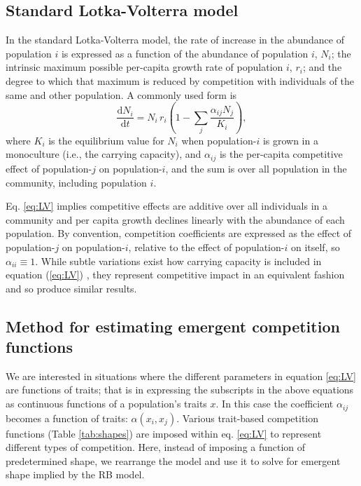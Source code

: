 \documentclass[a4paper,11pt]{article}
\newcommand{\ud}{\ensuremath{\mathrm{d}}}
\begin{document}
\subsection{Standard Lotka-Volterra model}

In the standard Lotka-Volterra model, the rate of increase in the abundance of population $i$ is expressed as a function of the abundance of population $i$, $N_i$; the intrinsic maximum possible per-capita growth rate of population $i$, $r_i$; and the degree to which that maximum is reduced by competition with individuals of the same and other population. A commonly used form \citep[e.g.][]{Lotka-1932, Andrewartha-1953, Dieckmann-1999} is 
\begin{equation} \label{eq:LV} 
	\frac{\ud N_i}{\ud t} = N_i\, r_i \left(1 - \sum_j \frac{\alpha_{ij} N_j}{K_i}\right), 
\end{equation}
where $K_i$ is the equilibrium value for $N_i$ when population-$i$ is grown in a monoculture (i.e., the carrying capacity), and $\alpha_{ij}$ is the per-capita competitive effect of population-$j$ on population-$i$, and the sum is over all population in the community, including population $i$. 

Eq. \ref{eq:LV} implies competitive effects are additive over all individuals in a community and per capita growth declines linearly with the abundance of each population. By convention, competition coefficients are expressed as the effect of population-$j$ on population-$i$, relative to the effect of population-$i$ on itself, so $\alpha_{ii} \equiv 1$. While subtle variations exist how carrying capacity is included in equation (\ref{eq:LV}) \citep[e.g.][]{Chesson-2000, Leimar-2013}, they represent competitive impact in an equivalent fashion and so produce similar results.

\subsection{Method for estimating emergent competition functions}

We are interested in situations where the different parameters in equation \ref{eq:LV} are functions of traits; that is in expressing the subscripts in the above equations as continuous functions of a population’s traits $x$. In this case the coefficient $\alpha_{ij}$ becomes a function of traits: $\alpha(x_i, x_j)$. Various trait-based competition functions (Table \ref{tab:shapes}) are imposed within eq. \ref{eq:LV} to represent different types of competition. Here, instead of imposing a function of predetermined shape, we rearrange the model and use it to solve for emergent shape implied by the RB model. 
\end{document}
